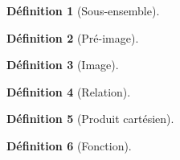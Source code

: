 \documentclass[12pt]{book}
\theoremstyle{definition}
\newtheorem{definition}{Définition}[section]
\begin{document}
\begin{definition}[Sous-ensemble]
    \label{def:sous_ensemble}
\end{definition}

\begin{definition}[Pré-image]
    \label{def:pre_image}
\end{definition}

\begin{definition}[Image]
    \label{def:image}
\end{definition}

\begin{definition}[Relation]
    \label{def:relation}
\end{definition}

\begin{definition}[Produit cartésien]
    \label{def:produit_cartesien}
\end{definition}

\begin{definition}[Fonction]
    \label{def:fonction}
\end{definition}
\end{document}
